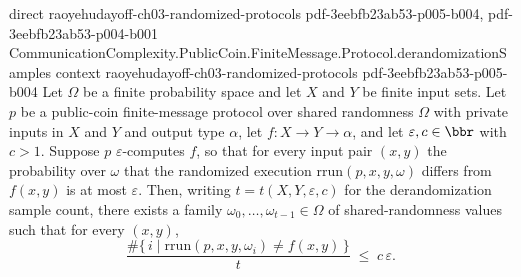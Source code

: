 \begin{theorem}
  {direct}
  {raoyehudayoff-ch03-randomized-protocols}
  {pdf-3eebfb23ab53-p005-b004,
    pdf-3eebfb23ab53-p004-b001}
\proofstep
  {CommunicationComplexity.PublicCoin.FiniteMessage.Protocol.derandomizationSamples}
  {context}
  {raoyehudayoff-ch03-randomized-protocols}
  {pdf-3eebfb23ab53-p005-b004}
Let $\Omega$ be a finite probability space and let $X$ and $Y$ be finite input sets. Let
$p$ be a public-coin finite-message protocol over shared randomness $\Omega$ with
private inputs in $X$ and $Y$ and output type $\alpha$, let $f : X \to Y \to \alpha$,
and let $\varepsilon, c \in \bbr$ with $c > 1$. Suppose $p$ $\varepsilon$-computes $f$,
so that for every input pair $(x,y)$ the probability over $\omega$ that the randomized
execution $\mathrm{rrun}(p,x,y,\omega)$ differs from $f(x,y)$ is at most $\varepsilon$.
Then, writing $t = t(X,Y,\varepsilon,c)$ for the derandomization sample count, there
exists a family $\omega_0, \dots, \omega_{t-1} \in \Omega$ of shared-randomness values
such that for every $(x,y)$,
\[
\frac{\#\{\, i \mid \mathrm{rrun}(p,x,y,\omega_i) \ne f(x,y) \,\}}{t} \;\le\;
c\,\varepsilon.
\]
\end{theorem}
